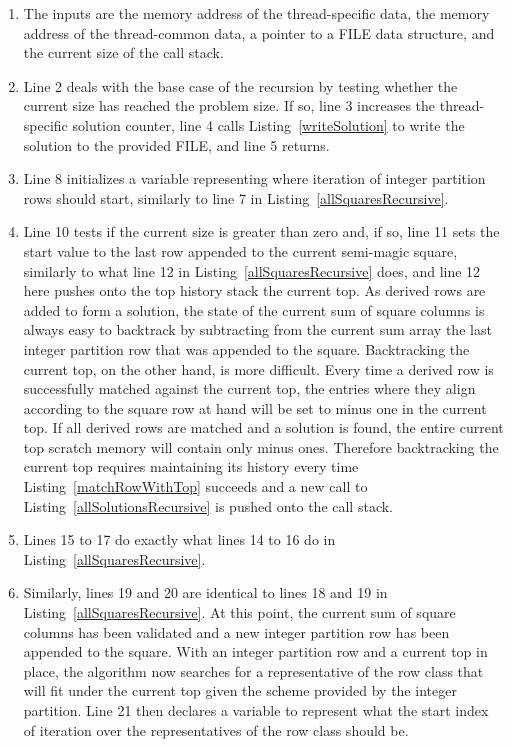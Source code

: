 \begin{enumerate}
\item The inputs are the memory address of the thread-specific data, the memory address of the thread-common data, a pointer to a FILE data structure, and the current size of the call stack.
\item Line 2 deals with the base case of the recursion by testing whether the current size has reached the problem size. If so, line 3 increases the thread-specific solution counter, line 4 calls Listing~\ref{writeSolution} to write the solution to the provided FILE, and line 5 returns.
\addtocounter{enumi}{5}
\item Line 8 initializes a variable representing where iteration of integer partition rows should start, similarly to line 7 in Listing~\ref{allSquaresRecursive}.
\addtocounter{enumi}{1}
\item Line 10 tests if the current size is greater than zero and, if so, line 11 sets the start value to the last row appended to the current semi-magic square, similarly to what line 12 in Listing~\ref{allSquaresRecursive} does, and line 12 here pushes onto the top history stack the current top. As derived rows are added to form a solution, the state of the current sum of square columns is always easy to backtrack by subtracting from the current sum array the last integer partition row that was appended to the square. Backtracking the current top, on the other hand, is more difficult. Every time a derived row is successfully matched against the current top, the entries where they align according to the square row at hand will be set to minus one in the current top. If all derived rows are matched and a solution is found, the entire current top scratch memory will contain only minus ones. Therefore backtracking the current top requires maintaining its history every time Listing~\ref{matchRowWithTop} succeeds and a new call to Listing~\ref{allSolutionsRecursive} is pushed onto the call stack.
\addtocounter{enumi}{4}
\item Lines 15 to 17 do exactly what lines 14 to 16 do in Listing~\ref{allSquaresRecursive}.
\addtocounter{enumi}{3}
\item Similarly, lines 19 and 20 are identical to lines 18 and 19 in Listing~\ref{allSquaresRecursive}. At this point, the current sum of square columns has been validated and a new integer partition row has been appended to the square. With an integer partition row and a current top in place, the algorithm now searches for a representative of the row class that will fit under the current top given the scheme provided by the integer partition. Line 21 then declares a variable to represent what the start index of iteration over the representatives of the row class should be.

\end{enumerate}
